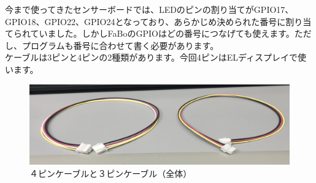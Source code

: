 今まで使ってきたセンサーボードでは、LEDのピンの割り当てがGPIO17、GPIO18、GPIO22、GPIO24となっており、あらかじめ決められた番号に割り当てられていました。しかしFaBoのGPIOはどの番号につなげても使えます。ただし、プログラムも番号に合わせて書く必要があります。\\
ケーブルは3ピンと4ピンの2種類があります。今回4ピンはELディスプレイで使います。\\
\begin{figure}[h]
  \begin{center}
    \includegraphics[scale=0.6]{images/chap05/text05-img013.png}
    \caption{４ピンケーブルと３ピンケーブル（全体）}
  \end{center}
\end{figure}
